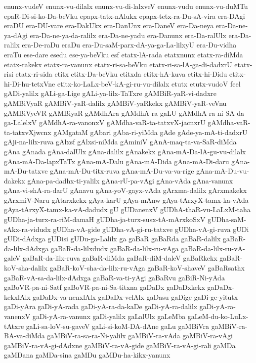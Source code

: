 {enunx-vudeV
enunx-vu-dilalx
enunx-vu-di-lalxveV
enunx-vudu
enunx-vu-duMTu
epaR-Di-si-ko-Da-beVku
epapx-tatx-nAlukx
epapx-tetx-ra-Du-sA-vira
era-DAgi
eraDU
era-DU-vare
era-DakUkx
era-DanUnx
era-DaneV
era-Da-neya
era-Da-ne-ya-dAgi
era-Da-ne-ya-da-ralilx
era-Da-ne-yadu
era-Danunx
era-Da-ralUlx
era-Da-ralilx
era-De-raDu
eraDu
era-Du-saM-parx-dA-ya-ga-La-lilxyU
era-Du-vidha
eraTu
ese-dare
esedu
ese-ya-beVku
esf
etatx-lA-rada
etatxnunx
etatx-ra-diMda
etatx-rakekx
etatx-ra-vanunx
etatx-ri-sa-beVku
etatx-ri-sa-lA-ga-di-dadxrU
etatx-risi
etatx-ri-sida
etitx
etitx-Da-beVku
etitxda
etitx-hA-kuva
etitx-hi-Didu
etitx-hi-Di-hu-tetxVne
etitx-ko-LaLx-beV-kA-gi-ru-vu-dilalx
etutx
etutx-vudoV
feel
gADi-yalilx
gALi-ga-Lige
gALi-ya-lilx-TaTxre
gAMBiR-yaR-vi-dadxre
gAMBiVyaR
gAMBiV-yaR-dalilx
gAMBiV-yaRkekx
gAMBiV-yaR-veVnu
gAMBiVyeVR
gAMBiyaR
gAMdhAra
gAMdhA-ra-gaLU
gAMdhA-ra-ni-SA-da-ga-LalelxV
gAMdhA-ra-vanonxV
gAMdha-vaR-ta-tatxvX-jacnxrU
gAMdha-vaR-ta-tatxvXjwcnx
gAMgataM
gAbari
gAba-ri-yiMda
gAde
gAde-ya-mA-ti-dadxrU
gAji-na-lilx-ruva
gAlxsf
gAlxsi-niMda
gAminiV
gAnA-maq-ta-va-SaR-diMda
gAna
gAnada
gAna-dalUlx
gAna-dalilx
gAnakekx
gAna-mA-Da-lA-gu-vu-dilalx
gAna-mA-Da-lapxTaTx
gAna-mA-Dalu
gAna-mA-Dida
gAna-mA-Di-daru
gAna-mA-Du-tatxve
gAna-mA-Du-titx-ruva
gAna-mA-Du-va-va-rige
gAna-mA-Du-vu-dakekx
gAna-pa-dadhx-ti-yalilx
gAna-rU-pa-vAgi
gAna-vAda
gAna-vanunx
gAna-vi-shA-ra-darU
gAnavu
gAna-yoV-gayx-vAda
gArxma-dalilx
gArxmakekx
gArxmiV-Naru
gAtarxkekx
gAya-karU
gAya-mAnw
gAya-tArxyX-tamx-ka-vAda
gAya-tArxyX-tamx-ka-vA-dadudx
gU
gUDanenxV
gUDhA-thaR-vu-LaLxM-taha
gUDha-ja-turx-ra-riM-damaH
gUDha-ja-turx-susx-tA-mArxkoSxV
gUDha-saM-sAkx-ra-vidudx
gUDha-vA-gide
gUDha-vA-gi-ru-tatxve
gUDha-vA-gi-ruva
gUDi
gUDi-dAdxga
gUDisi
gUDu-ga-Lalilx
ga
gaBaR
gaBaRda
gaBaR-dalilx
gaBaR-da-lilx-dAdxga
gaBaR-da-lilxdudx
gaBaR-da-lilx-ru-vAga
gaBaR-da-lilx-ru-vA-galeV
gaBaR-da-lilx-ruva
gaBaR-diMda
gaBaR-diM-daleV
gaBaRkekx
gaBaR-koV-sha-dalilx
gaBaR-koV-sha-da-lilx-ru-vAga
gaBaR-koV-shaveV
gaBaRsathx
gaBaR-vA-sa-da-lilx-dAdxga
gaBaR-va-ti-yAgi
gaBaRvu
gaBiR-Ni-yAda
gaBoVR-pa-ni-Satf
gaBoVR-pa-ni-Sa-titxna
gaDaDx
gaDaDxkekx
gaDaDx-kekxlAlx
gaDaDx-va-nenxlAlx
gaDaDx-velAlx
gaDasu
gaDige
gaDi-ge-yitutx
gaDi-yAra
gaDi-yA-rada
gaDi-yA-ra-da-kaDe
gaDi-yA-ra-dalilx
gaDi-yA-ra-vanenxV
gaDi-yA-ra-vanunx
gaDi-yalilx
gaLalUlx
gaLeMba
gaLeM-du-ko-LuLx-tAtxre
gaLi-sa-loV-su-gaveV
gaLi-si-koM-DA-dAne
gaLu
gaMBiVra
gaMBiV-ra-BA-va-diMda
gaMBiV-ra-sa-ra-Ni-yalilx
gaMBiV-ra-vAda
gaMBiV-ra-vAgi
gaMBiV-ra-vA-gi-dAdxne
gaMBiV-ra-vA-gide
gaMBiV-ra-vA-gi-rali
gaMDa
gaMDana
gaMDa-sina
gaMDu
gaMDu-ha-kikx-yanunx
}
